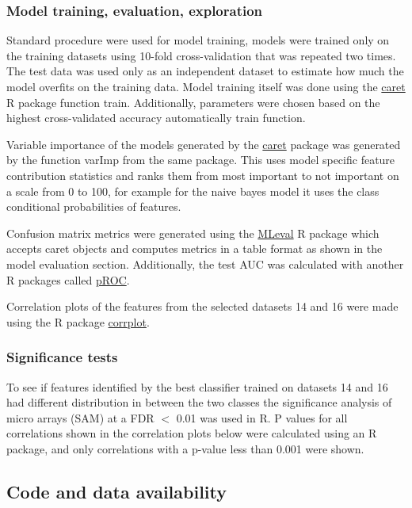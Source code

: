 \subsubsection{Model training, evaluation, exploration}

Standard procedure were used for model training, models were trained only on the training datasets using 10-fold cross-validation that was repeated two times.
The test data was used only as an independent dataset to estimate how much the model overfits on the training data.
Model training itself was done using the \href{https://topepo.github.io/caret/}{caret} R package function train.
Additionally, parameters were chosen based on the highest cross-validated accuracy automatically train function.

Variable importance of the models generated by the \href{https://topepo.github.io/caret/}{caret} package was generated by the function varImp from the same package.
This uses model specific feature contribution statistics and ranks them from most important to not important on a scale from 0 to 100, for example for the naive bayes model it uses the class conditional probabilities of features.

Confusion matrix metrics were generated using the \href{https://cran.r-project.org/web/packages/MLeval/index.html}{MLeval} R package which accepts caret objects and computes metrics in a table format as shown in the model evaluation section.
Additionally, the test AUC was calculated with another R packages called \href{https://cran.r-project.org/web/packages/pROC/pROC.pdf}{pROC}.

Correlation plots of the features from the selected datasets 14 and 16 were made using the R package \href{https://cran.r-project.org/web/packages/corrplot/vignettes/corrplot-intro.html}{corrplot}.

\subsubsection{Significance tests}

To see if features identified by the best classifier trained on datasets 14 and 16 had different distribution in between the two classes the significance analysis of micro arrays (SAM) at a FDR \(<\) 0.01 was used in R.
P values for all correlations shown in the correlation plots below were calculated using an R package, and only correlations with a p-value less than 0.001 were shown.

\subsection{Code and data availability}

